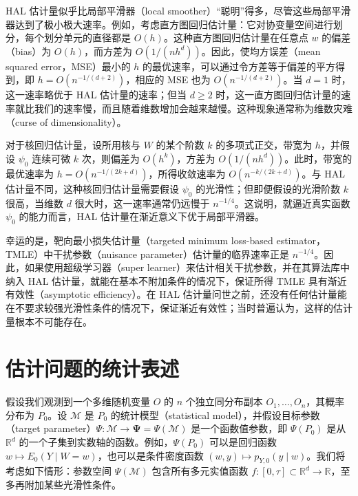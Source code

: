 HAL 估计量似乎比局部平滑器（local smoother）“聪明”得多，尽管这些局部平滑器达到了极小极大速率。例如，考虑直方图回归估计量：它对协变量空间进行划分，每个划分单元的直径都是 $O(h)$。这种直方图回归估计量在任意点 $w$ 的偏差（bias）为 $O(h)$，而方差为 $O(1/(nh^d))$。因此，使均方误差（mean squared error，MSE）最小的 $h$ 的最优速率，可以通过令方差等于偏差的平方得到，即 $h=O(n^{-1/(d+2)})$，相应的 MSE 也为 $O(n^{-1/(d+2)})$。当 $d=1$ 时，这一速率略优于 HAL 估计量的速率；但当 $d\geq2$ 时，这一直方图回归估计量的速率就比我们的速率慢，而且随着维数增加会越来越慢。这种现象通常称为维数灾难（curse of dimensionality）。

对于核回归估计量，设所用核与 $W$ 的某个阶数 $k$ 的多项式正交，带宽为 $h$，并假设 $\psi_0$ 连续可微 $k$ 次，则偏差为 $O(h^k)$，方差为 $O(1/(nh^d))$。此时，带宽的最优速率为 $h=O(n^{-1/(2k+d)})$，所得收敛速率为 $O(n^{-k/(2k+d)})$。与 HAL 估计量不同，这种核回归估计量需要假设 $\psi_0$ 的光滑性；但即便假设的光滑阶数 $k$ 很高，当维数 $d$ 很大时，这一速率通常仍远慢于 $n^{-1/4}$。这说明，就逼近真实函数 $\psi_0$ 的能力而言，HAL 估计量在渐近意义下优于局部平滑器。

幸运的是，靶向最小损失估计量（targeted minimum loss-based estimator，TMLE）中干扰参数（nuisance parameter）估计量的临界速率正是 $n^{-1/4}$。因此，如果使用超级学习器（super learner）来估计相关干扰参数，并在其算法库中纳入 HAL 估计量，就能在基本不附加条件的情况下，保证所得 TMLE 具有渐近有效性（asymptotic efficiency）。在 HAL 估计量问世之前，还没有任何估计量能在不要求较强光滑性条件的情况下，保证渐近有效性；当时普遍认为，这样的估计量根本不可能存在。

\section{估计问题的统计表述}
\label{sec:ch06-statistical-formulation}

假设我们观测到一个多维随机变量 $O$ 的 $n$ 个独立同分布副本 $O_1,\ldots,O_n$，其概率分布为 $P_0$。设 $\mathcal M$ 是 $P_0$ 的统计模型（statistical model），并假设目标参数（target parameter）$\Psi:\mathcal M\to\boldsymbol{\Psi}=\Psi(\mathcal M)$ 是一个函数值参数，即 $\Psi(P_0)$ 是从 $\mathbb R^d$ 的一个子集到实数轴的函数。例如，$\Psi(P_0)$ 可以是回归函数 $w\mapsto E_0(Y\mid W=w)$，也可以是条件密度函数 $(w,y)\mapsto p_{Y,0}(y\mid w)$。我们将考虑如下情形：参数空间 $\Psi(\mathcal M)$ 包含所有多元实值函数 $f:[0,\tau]\subset\mathbb R^d\to\mathbb R$，至多再附加某些光滑性条件。


